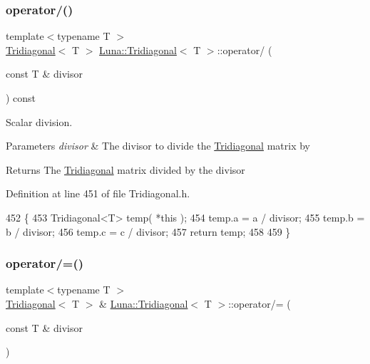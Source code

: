 \subsubsection{\texorpdfstring{operator/()}{operator/()}}
{\footnotesize\ttfamily template$<$typename T $>$ \\
\hyperlink{classLuna_1_1Tridiagonal}{Tridiagonal}$<$ T $>$ \hyperlink{classLuna_1_1Tridiagonal}{Luna\+::\+Tridiagonal}$<$ T $>$\+::operator/ (\begin{DoxyParamCaption}\item[{const T \&}]{divisor }\end{DoxyParamCaption}) const\hspace{0.3cm}{\ttfamily [inline]}}



Scalar division. 


\begin{DoxyParams}{Parameters}
{\em divisor} & The divisor to divide the \hyperlink{classLuna_1_1Tridiagonal}{Tridiagonal} matrix by \\
\hline
\end{DoxyParams}
\begin{DoxyReturn}{Returns}
The \hyperlink{classLuna_1_1Tridiagonal}{Tridiagonal} matrix divided by the divisor 
\end{DoxyReturn}


Definition at line 451 of file Tridiagonal.\+h.


\begin{DoxyCode}
452   \{
453     Tridiagonal<T> temp( *\textcolor{keyword}{this} );
454     temp.a = a / divisor;
455     temp.b = b / divisor;
456     temp.c = c / divisor;
457     \textcolor{keywordflow}{return} temp;
458 
459   \}
\end{DoxyCode}
\mbox{\label{classLuna_1_1Tridiagonal_a0508de0c1797db737adaff1a6ee63763}} 
\subsubsection{\texorpdfstring{operator/=()}{operator/=()}}
{\footnotesize\ttfamily template$<$typename T $>$ \\
\hyperlink{classLuna_1_1Tridiagonal}{Tridiagonal}$<$ T $>$ \& \hyperlink{classLuna_1_1Tridiagonal}{Luna\+::\+Tridiagonal}$<$ T $>$\+::operator/= (\begin{DoxyParamCaption}\item[{const T \&}]{divisor }\end{DoxyParamCaption})\hspace{0.3cm}{\ttfamily [inline]}}



